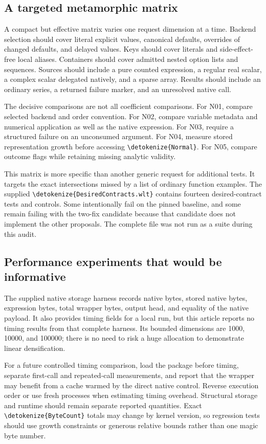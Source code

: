 \documentclass[11pt]{article}
\newcommand{\code}[1]{{\ttfamily\expandafter\nolinkurl\expandafter{\detokenize{#1}}}}
\begin{document}
\subsection{A targeted metamorphic matrix}
A compact but effective matrix varies one request dimension at a time. Backend selection should cover literal explicit values, canonical defaults, overrides of changed defaults, and delayed values. Keys should cover literals and side-effect-free local aliases. Containers should cover admitted nested option lists and sequences. Sources should include a pure counted expression, a regular real scalar, a complex scalar delegated natively, and a sparse array. Results should include an ordinary series, a returned failure marker, and an unresolved native call.

The decisive comparisons are not all coefficient comparisons. For N01, compare selected backend and order convention. For N02, compare variable metadata and numerical application as well as the native expression. For N03, require a structured failure on an unconsumed argument. For N04, measure stored representation growth before accessing \code{Normal}. For N05, compare outcome flags while retaining missing analytic validity.

This matrix is more specific than another generic request for additional tests. It targets the exact intersections missed by a list of ordinary function examples. The supplied \code{DesiredContracts.wlt} contains fourteen desired-contract tests and controls. Some intentionally fail on the pinned baseline, and some remain failing with the two-fix candidate because that candidate does not implement the other proposals. The complete file was not run as a suite during this audit.

\subsection{Performance experiments that would be informative}
The supplied native storage harness records native bytes, stored native bytes, expression bytes, total wrapper bytes, output head, and equality of the native payload. It also provides timing fields for a local run, but this article reports no timing results from that complete harness. Its bounded dimensions are 1000, 10000, and 100000; there is no need to risk a huge allocation to demonstrate linear densification.

For a future controlled timing comparison, load the package before timing, separate first-call and repeated-call measurements, and report that the wrapper may benefit from a cache warmed by the direct native control. Reverse execution order or use fresh processes when estimating timing overhead. Structural storage and runtime should remain separate reported quantities. Exact \code{ByteCount} totals may change by kernel version, so regression tests should use growth constraints or generous relative bounds rather than one magic byte number.
\end{document}

